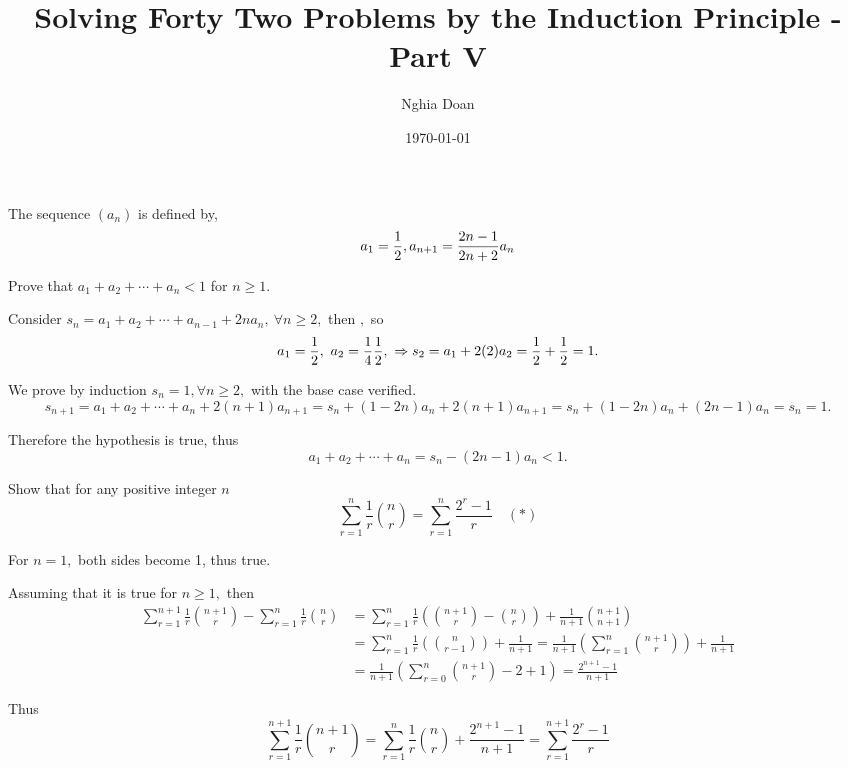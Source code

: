 \documentclass{article}
\title{Solving Forty Two Problems by the Induction Principle - Part V}
\author{Nghia Doan}
\date{\today}
\begin{document}
\maketitle

\begin{problem}
    The sequence $(a_n)$ is defined by,
    \[
        a_1 = \frac{1}{2}, a_{n+1} = \frac{2n-1}{2n+2} a_n
    \]
    
    Prove that $a_1 + a_2 + \cdots + a_n < 1$ for $n \ge 1.$
\end{problem}

\begin{soln}
    Consider $s_n = a_1 + a_2 + \cdots + a_{n-1} + 2n a_{n},\ \forall n\ge 2,$ then $,$
    so 
    \[
        a_1 = \half,\ a_2 = \frac{1}{4} \frac{1}{2},\ 
        \Rightarrow s_2 = a_1 + 2(2)a_2 = \half + \half = 1.
    \]

    We prove by induction $s_n = 1, \forall n\ge 2,$ with the base case verified.
    \[
        s_{n+1} = a_1 + a_2 + \cdots + a_{n} + 2(n+1)a_{n+1} = s_{n} + (1-2n)a_n + 2(n+1)a_{n+1}
        = s_{n} + (1-2n)a_n + (2n-1)a_n = s_n = 1.
    \]

    Therefore the hypothesis is true, thus
    \[
        a_1 + a_2 + \cdots + a_n  = s_n - (2n-1)a_n < 1.
    \]
\end{soln}

\begin{problem}
    Show that for any positive integer $n$
    \[
        \sum_{r=1}^{n} \frac{1}{r} \binom{n}{r} = \sum_{r=1}^{n} \frac{2^r-1}{r} \quad (*)
    \]
\end{problem}

\begin{soln}
    For $n=1,$ both sides become 1, thus true.

    Assuming that it is true for $n \ge 1,$ then
    \[
        \begin{aligned}
            \sum_{r=1}^{n+1} \frac{1}{r} \binom{n+1}{r} - \sum_{r=1}^{n} \frac{1}{r} \binom{n}{r}
            &= \sum_{r=1}^{n} \frac{1}{r} \left( \binom{n+1}{r} - \binom{n}{r} \right) + \frac{1}{n+1} \binom{n+1}{n+1}\\
            &= \sum_{r=1}^{n} \frac{1}{r} \left( \binom{n}{r-1} \right) + \frac{1}{n+1}
            = \frac{1}{n+1} \left( \sum_{r=1}^{n}  \binom{n+1}{r} \right) + \frac{1}{n+1}\\
            &= \frac{1}{n+1} \left( \sum_{r=0}^{n}  \binom{n+1}{r}  -2 + 1\right)
            = \frac{2^{n+1} -1}{n+1} 
        \end{aligned}
    \]

    Thus 
    \[
        \sum_{r=1}^{n+1} \frac{1}{r} \binom{n+1}{r} = \sum_{r=1}^{n} \frac{1}{r} \binom{n}{r} + \frac{2^{n+1} -1}{n+1} 
        = \sum_{r=1}^{n+1} \frac{2^r-1}{r} 
    \]
\end{soln}
\end{document}
